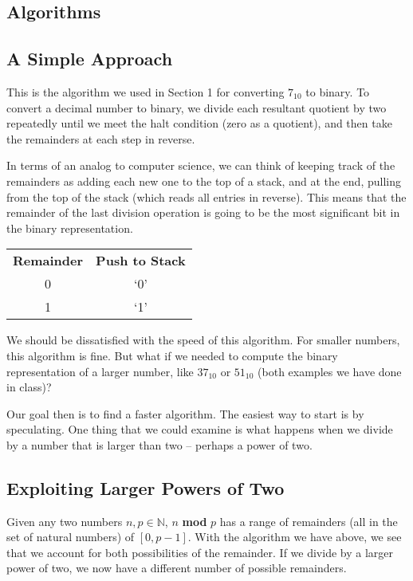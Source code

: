 \documentclass[12pt]{article}
\begin{document}
\newpage %



\begin{center}
  \section{Algorithms}
\end{center}
\subsection{A Simple Approach}
This is the algorithm we used in Section 1 for converting $7_{10}$ to binary.  To convert a decimal number to binary, we divide each resultant quotient by two repeatedly until we meet the halt condition (zero as a quotient), and then take the remainders at each step in reverse.

\par In terms of an analog to computer science, we can think of keeping track of the remainders as adding each new one to the top of a stack, and at the end, pulling from the top of the stack (which reads all entries in reverse). This means that the remainder of the last division operation is going to be the most significant bit in the binary representation.

\begin{center}
  \begin{tabular}{c|c}
    \textbf{Remainder} & \textbf{Push to Stack} \\
    0 & `0' \\
    1 & `1'
  \end{tabular}
\end{center}

\par We should be dissatisfied with the speed of this algorithm. For smaller numbers, this algorithm is fine. But what if we needed to compute the binary representation of a larger number, like $37_{10}$ or $51_{10}$ (both examples we have done in class)?

\par Our goal then is to find a faster algorithm. The easiest way to start is by speculating. One thing that we could examine is what happens when we divide by a number that is larger than two -- perhaps a power of two.

\subsection{Exploiting Larger Powers of Two}
Given any two numbers $n,p\in\mathbb{N}$, $n$ \textbf{mod} $p$ has a range of remainders (all in the set of natural numbers) of $[0,p-1]$. With the algorithm we have above, we see that we account for both possibilities of the remainder. If we divide by a larger power of two, we now have a different number of possible remainders.
\end{document}
